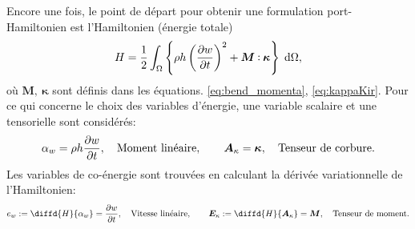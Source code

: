 Encore une fois, le point de départ pour obtenir une formulation port-Hamiltonien est l'Hamiltonien (énergie totale)
\begin{equation}
H = \frac{1}{2} \int_{\Omega} \left\{\rho h \left(\diffp{w}{t} \right)^2 + \bm{M} \cddot \bm{\kappa}  \right\}  \d{\Omega},
\end{equation}
où $ \bm{M}, \ \bm{\kappa} $ sont définis dans les équations. \eqref{eq:bend_momenta}, \eqref{eq:kappaKir}. Pour ce qui concerne le choix des variables d'énergie, une variable scalaire et une tensorielle sont considérés:
\begin{equation}
\alpha_w = \rho h \diffp{w}{t}, \quad \text{Moment linéaire}, \qquad \bm{A}_{\kappa} = \bm{\kappa}, \quad \text{Tenseur de corbure}.	
\end{equation}
Les variables de co-énergie sont trouvées en calculant la dérivée variationnelle de l'Hamiltonien:
\begin{equation}
e_w := \diffd{H}{\alpha_w} = \diffp{w}{t}, \quad \text{Vitesse linéaire},  \qquad  \bm{E}_{\kappa} := \diffd{H}{\bm{A}_{\kappa}} = \bm{M}, \quad \text{Tenseur de moment}.
\end{equation}

